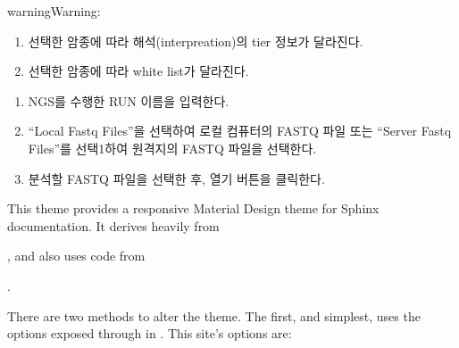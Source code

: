 \documentclass[letterpaper,10pt,english]{sphinxmanual}
\begin{document}
\begin{sphinxadmonition}{warning}{Warning:}\begin{enumerate}
%
\item {} 
선택한 암종에 따라 해석(interpreation)의 tier 정보가 달라진다.

\item {} 
선택한 암종에 따라 white list가 달라진다.

\end{enumerate}
\end{sphinxadmonition}
\begin{enumerate}
%
\item {} 
NGS를 수행한 RUN 이름을 입력한다.

\item {} 
“Local Fastq Files”을 선택하여 로컬 컴퓨터의 FASTQ 파일 또는
“Server Fastq Files”를 선택1하여 원격지의 FASTQ 파일을 선택한다.

\item {} 
분석할 FASTQ 파일을 선택한 후, 열기 버튼을 클릭한다.

\end{enumerate}

This theme provides a responsive Material Design theme for Sphinx
documentation. It derives heavily from
%
\begin{footnote}[3]\sphinxAtStartFootnote
{}
%
\end{footnote},
and also uses code from
%
\begin{footnote}[4]\sphinxAtStartFootnote
{}
%
\end{footnote}.

There are two methods to alter the theme.  The first, and simplest, uses the
options exposed through  in . This site’s
options are:
\end{document}
